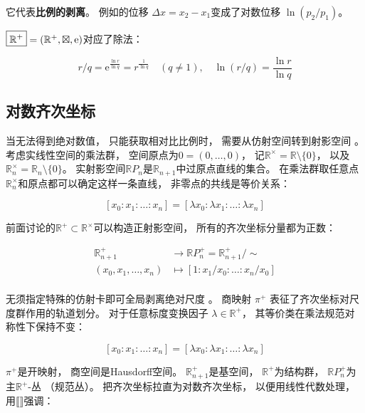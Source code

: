 ﻿\documentclass[10pt,a4paper]{article}
\newcommand{\sqtimes}{\mathbin{\boxtimes}}
\newcommand{\sqdiv}{\mathbin{\boxed{/}}}
\begin{document}
它代表\textbf{比例的剥离}。
例如的位移 $\Delta x = x_2 - x_1$变成了对数位移 $\ln(p_2 / p_1)$。

$\boxed{\mathbb R^+} = (\mathbb R^+,\sqtimes,\text e)$对应了除法：

\begin{equation*}
r \sqdiv q = \text{e}^{\frac{\ln r}{\ln q}} = r^{\frac{1}{\ln q}} \quad (q \neq 1),\quad
\ln(r \sqdiv q) = \frac{\ln r}{\ln q}
\end{equation*}


\subsection{对数齐次坐标}

当无法得到绝对数值，
只能获取相对比比例时，
需要从仿射空间转到射影空间
\cite{Hartshorne1977}。
考虑实线性空间的乘法群，
空间原点为$0=(0,\ldots,0)$，
记$\mathbb R^\times = \mathbb R \setminus \{0\}$，
以及$\mathbb R_n^\times = \mathbb R_n \setminus \{0\}$。
实射影空间$\mathbb R P_n$是$\mathbb R_{n+1}$中过原点直线的集合。
在乘法群取任意点$\mathbb R_n^\times$和原点都可以确定这样一条直线，
非零点的共线是等价关系：

$$
[x_0 : x_1 : \ldots : x_n] = [\lambda x_0 : \lambda x_1 : \ldots : \lambda x_n]
$$

前面讨论的$\mathbb R^+ \subset \mathbb R^\times$可以构造正射影空间，
所有的齐次坐标分量都为正数：

\begin{equation}
\begin{aligned}
\mathbb R_{n+1}^+ &\to \mathbb R P^+_n = \mathbb R_{n+1}^+/\sim \\
(x_0,x_1,\ldots,x_n) &\mapsto [1 : x_1/x_0 : \ldots : x_n/x_0] \\
\end{aligned}
\label{eq:proj-space-positive}
\end{equation}

无须指定特殊的仿射卡即可全局剥离绝对尺度 \cite{Hartshorne1977}。
商映射 $\pi^+$ 表征了齐次坐标对尺度群作用的轨道划分。
对于任意标度变换因子 $\lambda \in \mathbb{R}^+$，
其等价类在乘法规范对称性下保持不变：

$$
[x_0 : x_1 : \ldots : x_n] = [\lambda x_0 : \lambda x_1 : \ldots : \lambda x_n]
$$

$\pi^+$是开映射，
商空间是Hausdorff空间。
$\mathbb R_{n+1}^+$是基空间，
$\mathbb R^+$为结构群，
$\mathbb R P_n^+$为主$\mathbb R^+$-丛 （规范丛）。
把齐次坐标拉直为对数齐次坐标，
以便用线性代数处理，
用$\llbracket\rrbracket$强调：
\end{document}
